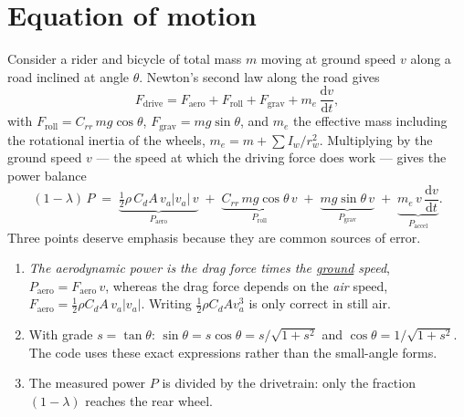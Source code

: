 \documentclass[11pt,a4paper]{article}
\newcommand{\CdA}{C_{\!d}A}
\newcommand{\dd}{\mathrm{d}}
\begin{document}
\section{Equation of motion}
\label{sec:balance}

Consider a rider and bicycle of total mass \(m\) moving at ground speed \(v\) along a road inclined at angle \(\theta\). Newton's second law along the road gives
\begin{equation}
 F_{\mathrm{drive}} = F_{\mathrm{aero}} + F_{\mathrm{roll}} + F_{\mathrm{grav}} + m_{e}\,\frac{\dd v}{\dd t},
\end{equation}
with \(F_{\mathrm{roll}}=C_{rr}\,m g\cos\theta\), \(F_{\mathrm{grav}}=m g\sin\theta\), and \(m_e\) the effective mass including the rotational inertia of the wheels, \(m_e=m+\sum I_w/r_w^2\). Multiplying by the ground speed \(v\) --- the speed at which the driving force does work --- gives the power balance \citep{martin1998}
\begin{equation}
 (1-\lambda)\,P \;=\; \underbrace{\tfrac12\rho\,\CdA\,v_a\lvert v_a\rvert\,v}_{P_{\mathrm{aero}}}
 \;+\; \underbrace{C_{rr}\,m g\cos\theta\,v}_{P_{\mathrm{roll}}}
 \;+\; \underbrace{m g\sin\theta\,v}_{P_{\mathrm{grav}}}
 \;+\; \underbrace{m_e\,v\,\frac{\dd v}{\dd t}}_{P_{\mathrm{accel}}}.
 \label{eq:balance}
\end{equation}
Three points deserve emphasis because they are common sources of error.
\begin{enumerate}
 \item \emph{The aerodynamic power is the drag force times the \underline{ground} speed}, \(P_{\mathrm{aero}}=F_{\mathrm{aero}}\,v\), whereas the drag force depends on the \emph{air} speed, \(F_{\mathrm{aero}}=\tfrac12\rho\CdA\,v_a\lvert v_a\rvert\). Writing \(\tfrac12\rho\CdA v_a^3\) is only correct in still air.
 \item With grade \(s=\tan\theta\): \(\sin\theta=s\cos\theta=s/\sqrt{1+s^2}\) and \(\cos\theta=1/\sqrt{1+s^2}\). The code uses these exact expressions rather than the small-angle forms.
 \item The measured power \(P\) is divided by the drivetrain: only the fraction \((1-\lambda)\) reaches the rear wheel.
\end{enumerate}
\end{document}
